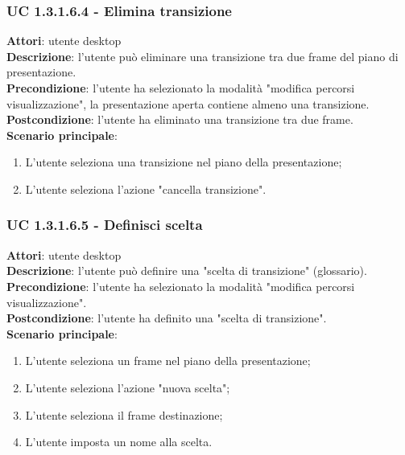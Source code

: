 \subsubsection{UC 1.3.1.6.4 - Elimina transizione}{
	\label{uc1.3.1.6.4}
	\textbf{Attori}: utente desktop \\
	\textbf{Descrizione}: l'utente può eliminare una transizione tra due frame del piano di presentazione. \\
	\textbf{Precondizione}: l'utente ha selezionato la modalità "modifica percorsi visualizzazione", la presentazione aperta contiene almeno una transizione.	\\
	\textbf{Postcondizione}: l'utente ha eliminato una transizione tra due frame.	\\
	\textbf{Scenario principale}:
	\begin{enumerate}
		\item L'utente seleziona una transizione nel piano della presentazione;
		\item L'utente seleziona l'azione "cancella transizione".
	\end{enumerate}
}
\subsubsection{UC 1.3.1.6.5 - Definisci scelta}{
	\label{uc1.3.1.6.5}
	\textbf{Attori}: utente desktop \\
	\textbf{Descrizione}: l'utente può definire una "scelta di transizione" (glossario). \\
	\textbf{Precondizione}: l'utente ha selezionato la modalità "modifica percorsi visualizzazione".	\\
	\textbf{Postcondizione}: l'utente ha definito una "scelta di transizione".	\\
	\textbf{Scenario principale}:
	\begin{enumerate}
		\item L'utente seleziona un frame nel piano della presentazione;
		\item L'utente seleziona l'azione "nuova scelta";
		\item L'utente seleziona il frame destinazione;
		\item L'utente imposta un nome alla scelta.
	\end{enumerate}
}
